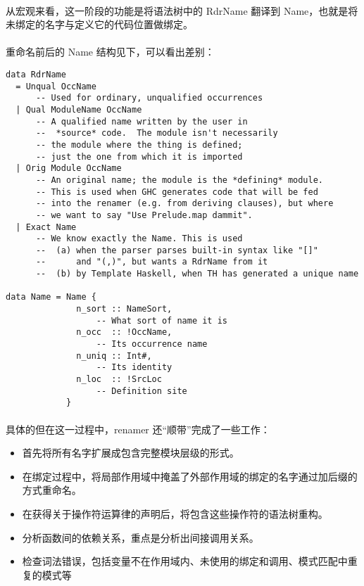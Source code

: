 \documentclass{article}
\begin{document}
	\paragraph{}
	从宏观来看，这一阶段的功能是将语法树中的 RdrName 翻译到 Name，也就是将未绑定的名字与定义它的代码位置做绑定。
	\paragraph{}
	重命名前后的 Name 结构见下，可以看出差别：
\begin{verbatim}
data RdrName 
  = Unqual OccName
      -- Used for ordinary, unqualified occurrences 
  | Qual ModuleName OccName
      -- A qualified name written by the user in 
      --  *source* code.  The module isn't necessarily 
      -- the module where the thing is defined; 
      -- just the one from which it is imported
  | Orig Module OccName
      -- An original name; the module is the *defining* module.
      -- This is used when GHC generates code that will be fed
      -- into the renamer (e.g. from deriving clauses), but where
      -- we want to say "Use Prelude.map dammit".  
  | Exact Name
      -- We know exactly the Name. This is used 
      --  (a) when the parser parses built-in syntax like "[]" 
      --      and "(,)", but wants a RdrName from it
      --  (b) by Template Haskell, when TH has generated a unique name	
      
data Name = Name {
              n_sort :: NameSort,
                  -- What sort of name it is
              n_occ  :: !OccName,
                  -- Its occurrence name
              n_uniq :: Int#,
                  -- Its identity
              n_loc  :: !SrcLoc
                  -- Definition site
            }
\end{verbatim}
	\paragraph{}
	具体的但在这一过程中，renamer 还“顺带”完成了一些工作：
	\begin{itemize}
		\item 首先将所有名字扩展成包含完整模块层级的形式。
		\item 在绑定过程中，将局部作用域中掩盖了外部作用域的绑定的名字通过加后缀的方式重命名。
		\item 在获得关于操作符运算律的声明后，将包含这些操作符的语法树重构。
		\item 分析函数间的依赖关系，重点是分析出间接调用关系。
		\item 检查词法错误，包括变量不在作用域内、未使用的绑定和调用、模式匹配中重复的模式等
	\end{itemize}
\end{document}
